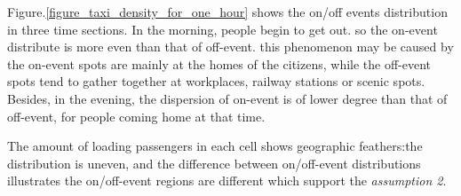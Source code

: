 Figure.\ref{figure_taxi_density_for_one_hour} shows the on/off events distribution in three time sections. In the morning, people begin to get out. so the on-event distribute is more even than that of off-event. this phenomenon may be caused by the on-event spots are mainly at the homes of the citizens, while the off-event spots tend to gather together at workplaces, railway stations or scenic spots. Besides, in the evening, the dispersion of on-event is of lower degree than that of off-event, for people coming home at that time.

The amount of loading passengers in each cell shows geographic feathers:the distribution is uneven, and the difference between on/off-event distributions illustrates the on/off-event regions are different which support the \emph{assumption 2}.
